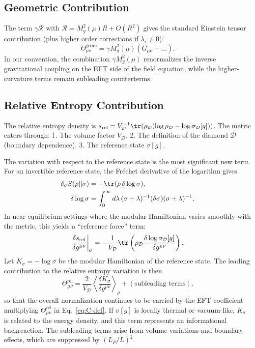 \documentclass[aps,prd,twocolumn,superscriptaddress,nofootinbib,floatfix]{revtex4-2}
\newcommand{\Ddom}{\mathcal{D}}
\newcommand{\Rdens}{\mathcal{R}}
\newcommand{\Tmn}{\Theta_{\mu\nu}}
\newcommand{\sr}{s_{\mathrm{rel}}}
\begin{document}
\subsection{Geometric Contribution}
The term $\gamma \Rdens$ with $\Rdens = M_g^2(\mu)R + O(R^2)$ gives the standard Einstein tensor contribution (plus higher order corrections if $\lambda_i \neq 0$):
\begin{equation}
    \Tmn^{\mathrm{geom}} = \gamma M_g^2(\mu)\left( G_{\mu\nu} + \dots \right).
\end{equation}
In our convention, the combination $\gamma M_g^2(\mu)$ renormalizes the inverse gravitational coupling on the EFT side of the field equation, while the higher-curvature terms remain subleading counterterms.

\subsection{Relative Entropy Contribution}
The relative entropy density is $\sr = V_{\Ddom}^{-1} \tr(\rho_{\Ddom} (\log \rho_{\Ddom} - \log \sigma_{\Ddom}[g]))$.
The metric enters through:
1. The volume factor $V_{\Ddom}$.
2. The definition of the diamond $\Ddom$ (boundary dependence).
3. The reference state $\sigma[g]$.

The variation with respect to the reference state is the most significant new term. For an invertible reference state, the Fr\'echet derivative of the logarithm gives
\begin{align}
    \delta_\sigma S(\rho||\sigma) &= - \tr(\rho\, \delta \log \sigma), \\
    \delta \log \sigma &= \int_0^\infty d\lambda \,
    (\sigma+\lambda)^{-1} (\delta \sigma) (\sigma+\lambda)^{-1}.
\end{align}
In near-equilibrium settings where the modular Hamiltonian varies smoothly with the metric, this yields a ``reference force'' term:
\begin{equation}
    \frac{\delta \sr}{\delta g^{\mu\nu}} \bigg|_{\sigma} = - \frac{1}{V_{\Ddom}} \tr \left( \rho_{\Ddom} \frac{\delta \log \sigma_{\Ddom}[g]}{\delta g^{\mu\nu}} \right).
\end{equation}
Let $K_{\sigma} = - \log \sigma$ be the modular Hamiltonian of the reference state. The leading contribution to the relative entropy variation is then
\begin{equation}
    \Tmn^{\mathrm{rel}} = \frac{2}{V_{\Ddom}} \left\langle \frac{\delta K_{\sigma}}{\delta g^{\mu\nu}} \right\rangle_{\rho} + (\text{subleading terms}).
\end{equation}
so that the overall normalization continues to be carried by the EFT coefficient multiplying $\Tmn^{\mathrm{rel}}$ in Eq.~\eqref{eq:C-def}. If $\sigma[g]$ is locally thermal or vacuum-like, $K_{\sigma}$ is related to the energy density, and this term represents an informational backreaction. The subleading terms arise from volume variations and boundary effects, which are suppressed by $(L_P/L)^2$.
\end{document}
